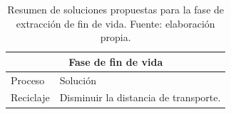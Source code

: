 \begin{table}[!htbp]
\centering
\begin{tabular}{p{5cm}p{9cm}}
\toprule
\multicolumn{2}{c}{Fase de fin de vida}\\
\midrule
Proceso & Solución\\
\midrule
{\footnotesize Reciclaje} & Disminuir la distancia de transporte.\\
\bottomrule
\end{tabular}
\caption[Resumen de soluciones propuestas para la fase de fin de vida.]{Resumen de soluciones propuestas para la fase de extracción de fin de vida. Fuente: elaboración propia.}
\label{resumensolucionesfdv}
\end{table}
